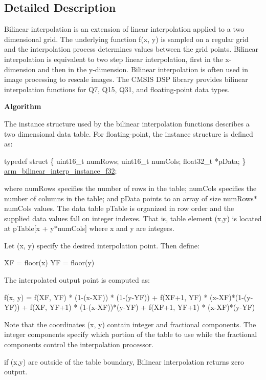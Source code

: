 \subsection{Detailed Description}
Bilinear interpolation is an extension of linear interpolation applied to a two dimensional grid. The underlying function {\ttfamily f(x, y)} is sampled on a regular grid and the interpolation process determines values between the grid points. Bilinear interpolation is equivalent to two step linear interpolation, first in the x-\/dimension and then in the y-\/dimension. Bilinear interpolation is often used in image processing to rescale images. The C\+M\+S\+IS D\+SP library provides bilinear interpolation functions for Q7, Q15, Q31, and floating-\/point data types.

{\bfseries{Algorithm}} \begin{DoxyParagraph}{}
The instance structure used by the bilinear interpolation functions describes a two dimensional data table. For floating-\/point, the instance structure is defined as\+: 
\begin{DoxyPre}
  typedef struct
  \{
    uint16\_t numRows;
    uint16\_t numCols;
    float32\_t *pData;
\} \mbox{\hyperlink{structarm__bilinear__interp__instance__f32}{arm\_bilinear\_interp\_instance\_f32}};
\end{DoxyPre}

\end{DoxyParagraph}
\begin{DoxyParagraph}{}
where {\ttfamily num\+Rows} specifies the number of rows in the table; {\ttfamily num\+Cols} specifies the number of columns in the table; and {\ttfamily p\+Data} points to an array of size {\ttfamily num\+Rows$\ast$num\+Cols} values. The data table {\ttfamily p\+Table} is organized in row order and the supplied data values fall on integer indexes. That is, table element (x,y) is located at {\ttfamily p\+Table\mbox{[}x + y$\ast$num\+Cols\mbox{]}} where x and y are integers.
\end{DoxyParagraph}
\begin{DoxyParagraph}{}
Let {\ttfamily (x, y)} specify the desired interpolation point. Then define\+: 
\begin{DoxyPre}
    XF = floor(x)
    YF = floor(y)
\end{DoxyPre}
 
\end{DoxyParagraph}
\begin{DoxyParagraph}{}
The interpolated output point is computed as\+: 
\begin{DoxyPre}
 f(x, y) = f(XF, YF) * (1-(x-XF)) * (1-(y-YF))
          + f(XF+1, YF) * (x-XF)*(1-(y-YF))
          + f(XF, YF+1) * (1-(x-XF))*(y-YF)
          + f(XF+1, YF+1) * (x-XF)*(y-YF)
\end{DoxyPre}
 Note that the coordinates (x, y) contain integer and fractional components. The integer components specify which portion of the table to use while the fractional components control the interpolation processor.
\end{DoxyParagraph}
\begin{DoxyParagraph}{}
if (x,y) are outside of the table boundary, Bilinear interpolation returns zero output. 
\end{DoxyParagraph}


